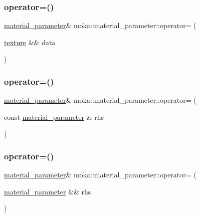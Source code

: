 \mbox{\label{structmoka_1_1material__parameter_a616a54bb248c88b4e0525d9e18c758cb}} 
\subsubsection{\texorpdfstring{operator=()}{operator=()}\hspace{0.1cm}{\footnotesize\ttfamily [11/26]}}
{\footnotesize\ttfamily \mbox{\hyperlink{structmoka_1_1material__parameter}{material\+\_\+parameter}}\& moka\+::material\+\_\+parameter\+::operator= (\begin{DoxyParamCaption}\item[{\mbox{\hyperlink{namespacemoka_aed2224bc0e5b79e57a8975ded94ee1aaa6d788fcb39cecfd54da7b065a8b75d1a}{texture}} \&\&}]{data }\end{DoxyParamCaption})}

\mbox{\label{structmoka_1_1material__parameter_a3ffbbae3a4eb694645010647117de3d8}} 
\subsubsection{\texorpdfstring{operator=()}{operator=()}\hspace{0.1cm}{\footnotesize\ttfamily [12/26]}}
{\footnotesize\ttfamily \mbox{\hyperlink{structmoka_1_1material__parameter}{material\+\_\+parameter}}\& moka\+::material\+\_\+parameter\+::operator= (\begin{DoxyParamCaption}\item[{const \mbox{\hyperlink{structmoka_1_1material__parameter}{material\+\_\+parameter}} \&}]{rhs }\end{DoxyParamCaption})}

\mbox{\label{structmoka_1_1material__parameter_a0bf5fe8870459340e2c2c5bdec5fc588}} 
\subsubsection{\texorpdfstring{operator=()}{operator=()}\hspace{0.1cm}{\footnotesize\ttfamily [13/26]}}
{\footnotesize\ttfamily \mbox{\hyperlink{structmoka_1_1material__parameter}{material\+\_\+parameter}}\& moka\+::material\+\_\+parameter\+::operator= (\begin{DoxyParamCaption}\item[{\mbox{\hyperlink{structmoka_1_1material__parameter}{material\+\_\+parameter}} \&\&}]{rhs }\end{DoxyParamCaption})\hspace{0.3cm}{\ttfamily [noexcept]}}

